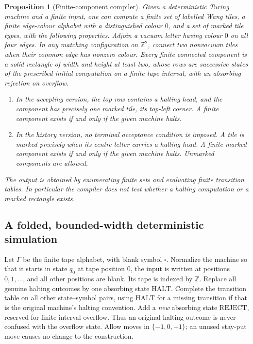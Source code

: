 \documentclass[11pt,reqno]{amsart}
\numberwithin{equation}{section}
\newtheorem{proposition}[theorem]{Proposition}
\theoremstyle{definition}
\theoremstyle{remark}
\begin{document}
\begin{proposition}[Finite-component compiler]
\label{appcomp:compiler}
Given a deterministic Turing machine and a finite input, one can compute a
finite set of labelled Wang tiles, a finite edge-colour alphabet with a
distinguished colour $0$, and a set of marked tile types, with the following
properties.  Adjoin a vacuum letter having colour $0$ on all four edges.
In any matching configuration on $\mathbb Z^2$, connect two nonvacuum
tiles when their common edge has nonzero colour.  Every finite connected
component is a solid rectangle of width and height at least two, whose rows
are successive states of the prescribed initial computation on a finite
tape interval, with an absorbing rejection on overflow.
\begin{enumerate}
\item In the \emph{accepting version}, the top row contains a halting head,
and the component has precisely one marked tile, its top-left corner.
A finite component exists if and only if the given machine halts.
\item In the \emph{history version}, no terminal acceptance condition is
imposed.  A tile is marked precisely when its centre letter carries a
halting head.  A finite \emph{marked} component exists if and only if the
given machine halts.  Unmarked components are allowed.
\end{enumerate}
The output is obtained by enumerating finite sets and evaluating finite
transition tables.  In particular the compiler does not test whether a
halting computation or a marked rectangle exists.
\end{proposition}

\subsection{A folded, bounded-width deterministic simulation}
\label{appcomp:folding}

Let $\Gamma$ be the finite tape alphabet, with blank symbol $\square$.
Normalize the machine so that it starts in state $q_0$ at tape position
$0$, the input is written at positions $0,1,\ldots$, and all other positions
are blank.  Its tape is indexed by $\mathbb Z$.  Replace all genuine halting
outcomes by one absorbing state $\mathrm{HALT}$.  Complete the transition
table on all other state--symbol pairs, using $\mathrm{HALT}$ for a missing
transition if that is the original machine's halting convention.  Add a
\emph{new} absorbing state $\mathrm{REJECT}$, reserved for finite-interval
overflow.  Thus an original halting outcome is never confused with the
overflow state.  Allow moves in $\{-1,0,+1\}$; an unused stay-put move causes
no change to the construction.
\end{document}
